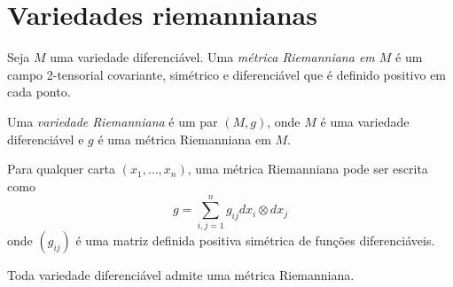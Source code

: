 
\cite{Lee2012}
\cite{Lee1997}
\cite{Carmo1988}



\section{Variedades riemannianas}

\begin{definicao}
	Seja $M$ uma variedade diferenciável. Uma \emph{métrica Riemanniana em $M$} é um campo 2-tensorial covariante, simétrico e diferenciável que é definido positivo em cada ponto.	
\end{definicao}

\begin{definicao}
	Uma \emph{variedade Riemanniana} é um par $(M,g)$, onde $M$ é uma variedade diferenciável e $g$ é uma métrica Riemanniana em $M$.
\end{definicao}

\begin{observacao}
	Para qualquer carta $(x_1, \ldots, x_n)$, uma métrica Riemanniana pode ser escrita como
	\begin{equation*}
		g = \sum_{i,j=1}^n g_{ij} dx_i \otimes dx_j
	\end{equation*}
	onde $(g_{ij})$ é uma matriz definida positiva simétrica de funções diferenciáveis.
\end{observacao}

\begin{proposicao}
Toda variedade diferenciável admite uma métrica Riemanniana.
\end{proposicao}


